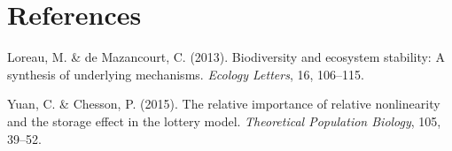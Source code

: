 \documentclass[11pt,]{article}
\begin{document}
\section*{References}\label{references}

\hypertarget{refs}{}
\hypertarget{ref-Loreau2013}{}
Loreau, M. \& de Mazancourt, C. (2013). Biodiversity and ecosystem
stability: A synthesis of underlying mechanisms. \emph{Ecology Letters},
16, 106--115.

\hypertarget{ref-Yuan2015}{}
Yuan, C. \& Chesson, P. (2015). The relative importance of relative
nonlinearity and the storage effect in the lottery model.
\emph{Theoretical Population Biology}, 105, 39--52.
\end{document}
